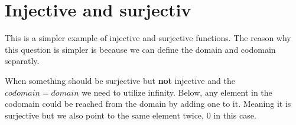 \documentclass[twocolumn,a4paper]{article}
\begin{document}
\newpage
\section*{Injective and surjectiv}
This is a simpler example of injective and surjective functions.
The reason why this question is simpler is because we can define the domain and codomain separatly.

\begin{figure}[ht]
	\centering
\end{figure}

When something should be surjective but \textbf{not} injective and the \(codomain = domain\) we need to utilize infinity.
Below, any element in the codomain could be reached from the domain by adding one to it.
Meaning it is surjective but we also point to the same element twice, 0 in this case.
\begin{figure}[ht]
	\centering
\end{figure}
\begin{figure}[ht]
	\centering
\end{figure}
\end{document}
